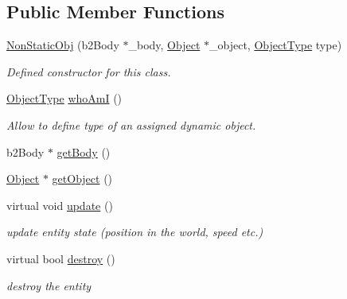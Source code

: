\subsection*{Public Member Functions}
\begin{DoxyCompactItemize}
\item 
\hyperlink{class_non_static_obj_a0295a381b988a0d0ab17eb3dcc229704}{Non\+Static\+Obj} (b2\+Body $\ast$\+\_\+body, \hyperlink{class_object}{Object} $\ast$\+\_\+object, \hyperlink{_non_static_obj_8h_a842c5e2e69277690b064bf363c017980}{Object\+Type} type)
\begin{DoxyCompactList}\small\item\em Defined constructor for this class. \end{DoxyCompactList}\item 
\hyperlink{_non_static_obj_8h_a842c5e2e69277690b064bf363c017980}{Object\+Type} \hyperlink{class_non_static_obj_a01e6db05d41ec62cb5c258b5069b083e}{who\+AmI} ()
\begin{DoxyCompactList}\small\item\em Allow to define type of an assigned dynamic object. \end{DoxyCompactList}\item 
b2\+Body $\ast$ \hyperlink{class_non_static_obj_a55713a3f848d7629176398333e84a015}{get\+Body} ()
\item 
\hyperlink{class_object}{Object} $\ast$ \hyperlink{class_non_static_obj_abdf0a375a987d99795bd298a1c84940c}{get\+Object} ()
\item 
\mbox{\label{class_non_static_obj_a6a67af264af5093665ca91273c9c6f34}} 
virtual void \hyperlink{class_non_static_obj_a6a67af264af5093665ca91273c9c6f34}{update} ()
\begin{DoxyCompactList}\small\item\em update entity state (position in the world, speed etc.) \end{DoxyCompactList}\item 
\mbox{\label{class_non_static_obj_a197ed3470e1a7b4f10b1e5567fdc5253}} 
virtual bool \hyperlink{class_non_static_obj_a197ed3470e1a7b4f10b1e5567fdc5253}{destroy} ()
\begin{DoxyCompactList}\small\item\em destroy the entity \end{DoxyCompactList}\end{DoxyCompactItemize}
